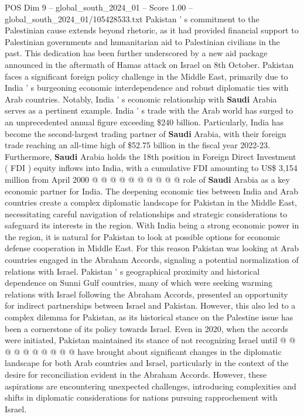 \begin{textsample}{POS Dim 9 – global\_south\_2024\_01 – Score 1.00 – global\_south\_2024\_01/105428533.txt}
Pakistan ' s commitment to the Palestinian cause extends beyond rhetoric, as it had provided financial support to Palestinian governments and humanitarian aid to Palestinian civilians in the past.
This dedication has been further underscored by a new aid package announced in the aftermath of Hamas attack on Israel on 8th October.
Pakistan faces a significant foreign policy challenge in the Middle East, primarily due to India ' s burgeoning economic interdependence and robust diplomatic ties with Arab countries.
Notably, India ' s economic relationship with \textbf{Saudi} Arabia serves as a pertinent example.
India ' s trade with the Arab world has surged to an unprecedented annual figure exceeding \$240 billion.
Particularly, India has become the second-largest trading partner of \textbf{Saudi} Arabia, with their foreign trade reaching an all-time high of \$52.75 billion in the fiscal year 2022-23.
Furthermore, \textbf{Saudi} Arabia holds the 18th position in Foreign Direct Investment ( FDI ) equity inflows into India, with a cumulative FDI amounting to US\$ 3,154 million from April 2000 @ @ @ @ @ @ @ @ @ @ role of \textbf{Saudi} Arabia as a key economic partner for India.
The deepening economic ties between India and Arab countries create a complex diplomatic landscape for Pakistan in the Middle East, necessitating careful navigation of relationships and strategic considerations to safeguard its interests in the region.
With India being a strong economic power in the region, it is natural for Pakistan to look at possible options for economic defense cooperation in Middle East.
For this reason Pakistan was looking at Arab countries engaged in the Abraham Accords, signaling a potential normalization of relations with Israel.
Pakistan ' s geographical proximity and historical dependence on Sunni Gulf countries, many of which were seeking warming relations with Israel following the Abraham Accords, presented an opportunity for indirect partnerships between Israel and Pakistan.
However, this also led to a complex dilemma for Pakistan, as its historical stance on the Palestine issue has been a cornerstone of its policy towards Israel.
Even in 2020, when the accords were initiated, Pakistan maintained its stance of not recognizing Israel until @ @ @ @ @ @ @ @ @ @ have brought about significant changes in the diplomatic landscape for both Arab countries and Israel, particularly in the context of the desire for reconciliation evident in the Abraham Accords.
However, these aspirations are encountering unexpected challenges, introducing complexities and shifts in diplomatic considerations for nations pursuing rapprochement with Israel.

\end{textsample}
